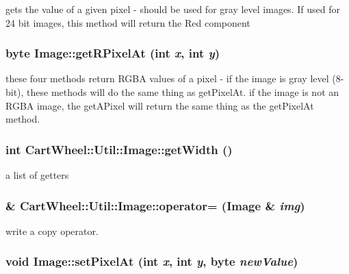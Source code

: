 \label{classCartWheel_1_1Util_1_1Image_a2586cc3cee4706b46c18e68cd5b77ced}
gets the value of a given pixel -\/ should be used for gray level images. If used for 24 bit images, this method will return the Red component \hypertarget{classCartWheel_1_1Util_1_1Image_a2280436db038ab38d89e3bf329e6f8b1}{
\subsubsection[{getRPixelAt}]{\setlength{\rightskip}{0pt plus 5cm}byte Image::getRPixelAt (int {\em x}, \/  int {\em y})}}
\label{classCartWheel_1_1Util_1_1Image_a2280436db038ab38d89e3bf329e6f8b1}
these four methods return RGBA values of a pixel -\/ if the image is gray level (8-\/bit), these methods will do the same thing as getPixelAt. if the image is not an RGBA image, the getAPixel will return the same thing as the getPixelAt method. \hypertarget{classCartWheel_1_1Util_1_1Image_a025c1f28ff56adced27cfce64c20cabb}{
\subsubsection[{getWidth}]{\setlength{\rightskip}{0pt plus 5cm}int CartWheel::Util::Image::getWidth ()}}
\label{classCartWheel_1_1Util_1_1Image_a025c1f28ff56adced27cfce64c20cabb}
a list of getters \hypertarget{classCartWheel_1_1Util_1_1Image_a37cec65e812b5e63ac60a87f492fe512}{
\subsubsection[{operator=}]{\& CartWheel::Util::Image::operator= ({\bf Image} \& {\em img})}}
\label{classCartWheel_1_1Util_1_1Image_a37cec65e812b5e63ac60a87f492fe512}
write a copy operator. \hypertarget{classCartWheel_1_1Util_1_1Image_a28ecf729560e39b56c1dd44b3d152b79}{
\subsubsection[{setPixelAt}]{\setlength{\rightskip}{0pt plus 5cm}void Image::setPixelAt (int {\em x}, \/  int {\em y}, \/  byte {\em newValue})}}
